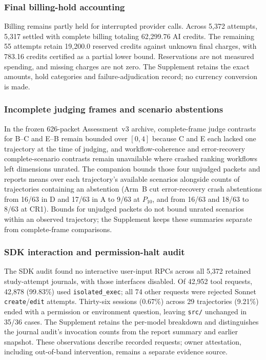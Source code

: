 \subsubsection{Final billing-hold accounting}

Billing remains partly held for interrupted provider calls. Across 5,372
attempts, 5,317 settled with complete billing totaling 62,299.76 AI credits.
The remaining 55 attempts retain 19,200.0 reserved credits against unknown
final charges, with 783.16 credits
certified as a partial lower bound. Reservations are not measured spending,
and missing charges are not zero. The Supplement retains the exact amounts,
hold categories and failure-adjudication record; no currency conversion is made.

\subsubsection{Incomplete judging frames and scenario abstentions}

\FloatBarrier
In the frozen 626-packet Assessment~v3 archive, complete-frame judge
contrasts for B--C and E--B remain bounded over $[0,4]$ because C and E
each lacked one trajectory at the time of judging, and workflow-coherence
and error-recovery complete-scenario contrasts remain unavailable where
crashed ranking workflows left dimensions unrated. The companion bounds
those four unjudged packets and reports means over each trajectory's
available scenarios alongside counts of trajectories containing an
abstention (Arm~B cut error-recovery crash abstentions from 16/63 in D and
17/63 in A to 9/63 at $P_{10}$, and from 16/63 and 18/63 to 8/63 at CR1).
Bounds for unjudged packets do not bound unrated scenarios within an
observed trajectory; the Supplement keeps these summaries separate from
complete-frame comparisons.

\subsubsection{SDK interaction and permission-halt audit}

The SDK audit found no interactive user-input RPCs across all 5,372 retained
study-attempt journals, with those interfaces disabled. Of 42,952 tool
requests, 42,878 (99.83\%) used \texttt{isolated\_exec}; all 74 other
requests were rejected Sonnet \texttt{create}/\texttt{edit} attempts.
Thirty-six sessions (0.67\%) across 29 trajectories (9.21\%) ended with a
permission or environment question, leaving \texttt{src/} unchanged in
35/36 cases. The Supplement retains the per-model breakdown and distinguishes
the journal audit's invocation counts from the report summary and earlier
snapshot. These observations describe recorded requests; owner attestation,
including out-of-band intervention, remains a separate evidence source.


